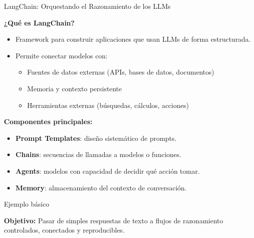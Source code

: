 \begin{frame}{LangChain: Orquestando el Razonamiento de los LLMs}

\textbf{¿Qué es LangChain?}
\begin{itemize}
    \item Framework para construir aplicaciones que usan LLMs de forma estructurada.
    \item Permite conectar modelos con:
    \begin{itemize}
        \item Fuentes de datos externas (APIs, bases de datos, documentos)
        \item Memoria y contexto persistente
        \item Herramientas externas (búsquedas, cálculos, acciones)
    \end{itemize}
\end{itemize}

\vspace{0.5em}

\textbf{Componentes principales:}
\begin{itemize}
    \item \textbf{Prompt Templates}: diseño sistemático de prompts.
    \item \textbf{Chains}: secuencias de llamadas a modelos o funciones.
    \item \textbf{Agents}: modelos con capacidad de decidir qué acción tomar.
    \item \textbf{Memory}: almacenamiento del contexto de conversación.
\end{itemize}

\vspace{0.5em}

\begin{block}{Ejemplo básico}
\tiny
\end{block}

\vspace{0.5em}

\textbf{Objetivo:} Pasar de simples respuestas de texto a flujos de razonamiento controlados, conectados y reproducibles.

\end{frame}

